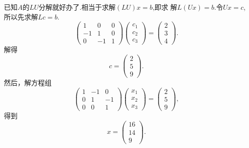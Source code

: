 ﻿\documentclass{book} \usepackage{exsheets} \usepackage{xeCJK}
\begin{document}
\begin{solution}
  已知$A$的$LU$分解就好办了.相当于求解$(LU)x=b$,即求
  解$L(Ux)=b$.令$Ux=c$,所以先求解$Lc=b$.
$$
\begin{pmatrix}
  1&0&0\\
  -1&1&0\\
  0&-1&1
\end{pmatrix}
\begin{pmatrix}
  c_1\\
  c_2\\
  c_3
\end{pmatrix}=
\begin{pmatrix}
  2\\
  3\\
  4
\end{pmatrix}.
$$
解得
$$
c=
\begin{pmatrix}
  2\\
  5\\
  9
\end{pmatrix}.
$$
然后，解方程组
$$
\begin{pmatrix}
  1&-1&0\\
  0&1&-1\\
  0&0&1
\end{pmatrix}
\begin{pmatrix}
  x_1\\
  x_2\\
  x_3
\end{pmatrix}=
\begin{pmatrix}
  2\\
  5\\
  9
\end{pmatrix},
$$
得到
$$
x=
\begin{pmatrix}
  16\\
  14\\
  9
\end{pmatrix}.
$$
\end{solution}
\end{document}
